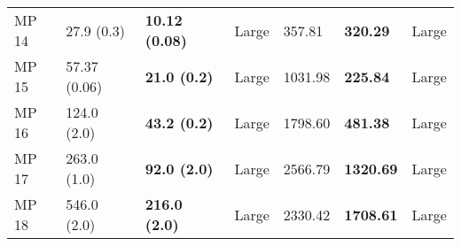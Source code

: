 \begin{tabular}{lllllll}
 MP 14 &        27.9 (0.3) &  \textbf{10.12 (0.08)} &       Large &                  357.81 &          \textbf{320.29} &       Large \\
 MP 15 &      57.37 (0.06) &    \textbf{21.0 (0.2)} &       Large &                 1031.98 &          \textbf{225.84} &       Large \\
 MP 16 &       124.0 (2.0) &    \textbf{43.2 (0.2)} &       Large &                 1798.60 &          \textbf{481.38} &       Large \\
 MP 17 &       263.0 (1.0) &    \textbf{92.0 (2.0)} &       Large &                 2566.79 &         \textbf{1320.69} &       Large \\
 MP 18 &       546.0 (2.0) &   \textbf{216.0 (2.0)} &       Large &                 2330.42 &         \textbf{1708.61} &       Large \\
\bottomrule
\end{tabular}
